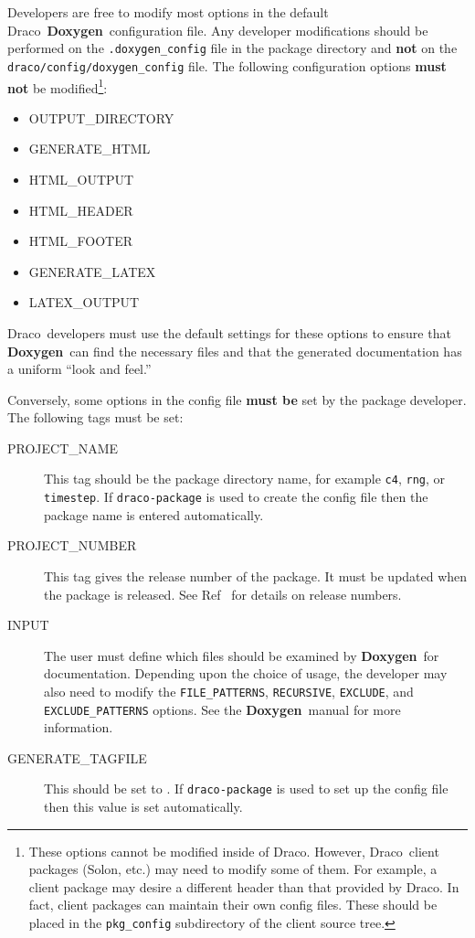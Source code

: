 \documentclass[11pt]{nmemo}
\newcommand{\draco}{{\normalfont\sffamily Draco}}
\newcommand{\solon}{{\normalfont\sffamily Solon}}
\newcommand{\doxy}{{\normalfont\bfseries Doxygen}}
\begin{document}
Developers are free to modify most options in the default \draco\ 
\doxy\ configuration file.  Any developer modifications should be
performed on the \texttt{.doxygen\_config} file in the package
directory and {\bf not} on the \texttt{draco/config/doxygen\_config}
file.  The following configuration options {\bf must not} be
modified\footnote{These options cannot be modified inside of \draco.
  However, \draco\ client packages (\solon, etc.) may need to modify
  some of them.  For example, a client package may desire a different
  header than that provided by \draco.  In fact, client packages can
  maintain their own config files.  These should be placed in the
  \texttt{pkg\_config} subdirectory of the client source tree.}:
\begin{itemize}
  \ttfamily
\item OUTPUT\_DIRECTORY
\item GENERATE\_HTML
\item HTML\_OUTPUT
\item HTML\_HEADER
\item HTML\_FOOTER
\item GENERATE\_LATEX
\item LATEX\_OUTPUT
\end{itemize}
\draco\ developers must use the default settings for these options to
ensure that \doxy\ can find the necessary files and that the generated 
documentation has a uniform ``look and feel.''

Conversely, some options in the config file {\bf must be} set by the
package developer.  The following tags must be set:
\begin{description}

\item[\ttfamily PROJECT\_NAME] This tag should be the package
  directory name, for example \texttt{c4}, \texttt{rng}, or
  \texttt{timestep}.  If \texttt{draco-package} is used to create the
  config file then the package name is entered automatically.
  
\item[\ttfamily PROJECT\_NUMBER] This tag gives the release number of
  the package.  It must be updated when the package is released.  See
  Ref~\cite{xtm:9936} for details on release numbers.
  
\item[\ttfamily INPUT] The user must define which files should be
  examined by \doxy\ for documentation.  Depending upon the choice of
  usage, the developer may also need to modify the
  \texttt{FILE\_PATTERNS}, \texttt{RECURSIVE}, \texttt{EXCLUDE}, and
  \texttt{EXCLUDE\_PATTERNS} options.  See the \doxy\ manual for more
  information.
  
\item[\ttfamily GENERATE\_TAGFILE] This should be set to
  .  If \texttt{draco-package} is used to
  set up the config file then this value is set automatically.

\end{description}
\end{document}
